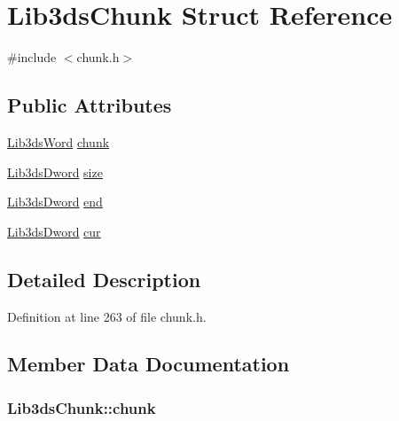 \hypertarget{struct_lib3ds_chunk}{\section{Lib3ds\-Chunk Struct Reference}
\label{struct_lib3ds_chunk}
}


{\ttfamily \#include $<$chunk.\-h$>$}

\subsection*{Public Attributes}
\begin{DoxyCompactItemize}
\item 
\hyperlink{types_8h_a439f68d12f4ad080599044949e41dba1}{Lib3ds\-Word} \hyperlink{struct_lib3ds_chunk_adb78758910edcdabab056160f85dccca}{chunk}
\item 
\hyperlink{types_8h_a299c9663303144c562f6bd92c2f273d3}{Lib3ds\-Dword} \hyperlink{struct_lib3ds_chunk_a76b6997253974515537be96154e42dec}{size}
\item 
\hyperlink{types_8h_a299c9663303144c562f6bd92c2f273d3}{Lib3ds\-Dword} \hyperlink{struct_lib3ds_chunk_a9c09407d6b39d44cdac9e9ed0d6653f6}{end}
\item 
\hyperlink{types_8h_a299c9663303144c562f6bd92c2f273d3}{Lib3ds\-Dword} \hyperlink{struct_lib3ds_chunk_a7d3fcb3881c4356de7370e2fb252100e}{cur}
\end{DoxyCompactItemize}


\subsection{Detailed Description}


Definition at line 263 of file chunk.\-h.



\subsection{Member Data Documentation}
\hypertarget{struct_lib3ds_chunk_adb78758910edcdabab056160f85dccca}{
\subsubsection[{chunk}]{ Lib3ds\-Chunk\-::chunk}}\label{struct_lib3ds_chunk_adb78758910edcdabab056160f85dccca}


